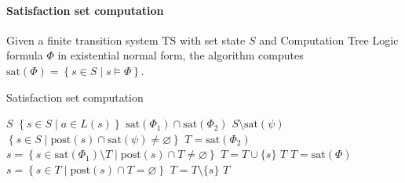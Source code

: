 \paragraph*{Satisfaction set computation}
Given a finite transition system $\text{TS}$ with set state $S$ and Computation Tree Logic formula $\Phi$ in existential normal form, the algorithm computes $\text{sat}(\Phi)=\left\{s\in S\mid s\models\Phi\right\}$.
\begin{algorithm}[H]
    \caption{Satisfaction set computation}
        \begin{algorithmic}[1]
            \Repeat     
                \Switch{$\Phi$}
                        \State \Return $S$
                    \EndCase
                        \State \Return $\left\{s\in S\mid a \in L(s)\right\}$
                    \EndCase
                        \State \Return $\text{sat}(\Phi_1)\cap\text{sat}(\Phi_2)$
                    \EndCase
                    \Case{$\lnot\psi$}
                        \State \Return $S\setminus\text{sat}(\psi)$
                    \EndCase
                    \Case{$\exists\bigcirc\psi$}
                        \State \Return $\left\{s\in S\mid\text{post}(s)\cap\text{sat}(\psi)\neq\varnothing\right\}$
                    \EndCase
                        \State $T=\text{sat}(\Phi_2)$ 
                            \State $s= \left\{s\in\text{sat}(\Phi_1)\setminus T\mid\text{post}(s)\cap T\neq \varnothing\right\}$
                            \State $T=T\cup\{s\}$ 
                        \EndWhile 
                        \State \Return $T$
                    \EndCase
                    \Case{$\exists\square\phi$}
                        \State $T=\text{sat}(\Phi)$ 
                            \State $s= \left\{s\in T\mid\text{post}(s)\cap T= \varnothing\right\}$
                            \State $T=T\setminus\{s\}$ 
                        \EndWhile 
                        \State \Return $T$
                    \EndCase
                \EndSwitch
        \end{algorithmic}
\end{algorithm}
